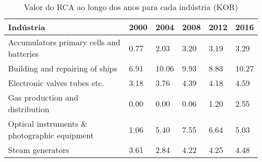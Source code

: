 \begin{table}
\centering
\caption{Valor do RCA ao longo dos anos para cada indústria (KOR)}
\label{tab:ex3-tempo-KOR}
\begin{tabular}{p{6cm}p{1.5cm}p{1.5cm}p{1.5cm}p{1.5cm}p{1.5cm}}
\toprule
                                   Indústria & 2000 &  2004 & 2008 & 2012 &  2016 \\
\midrule
    Accumulators primary cells and batteries & 0.77 &  2.03 & 3.20 & 3.19 &  3.29 \\
             Building and repairing of ships & 6.91 & 10.06 & 9.93 & 8.83 & 10.27 \\
                Electronic valves tubes etc. & 3.18 &  3.76 & 4.39 & 4.18 &  4.59 \\
             Gas production and distribution & 0.00 &  0.00 & 0.06 & 1.20 &  2.55 \\
Optical instruments \& photographic equipment & 1.06 &  5.40 & 7.55 & 6.64 &  5.03 \\
                            Steam generators & 3.61 &  2.84 & 4.22 & 4.25 &  4.48 \\
\bottomrule
\end{tabular}
\end{table}
